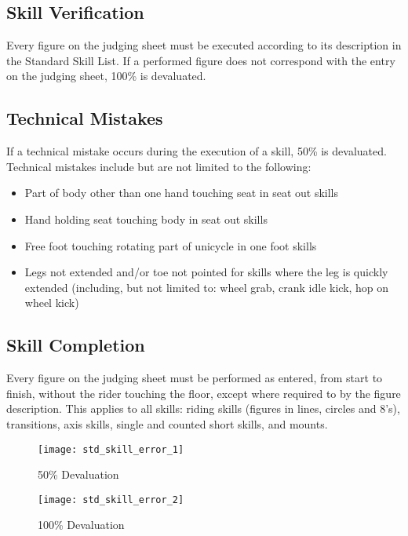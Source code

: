 \subsection{Skill Verification}
Every figure on the judging sheet must be executed according to its description in the Standard Skill List.
If a performed figure does not correspond with the entry on the judging sheet, 100\% is devaluated.

\subsection{Technical Mistakes}
If a technical mistake occurs during the execution of a skill, 50\% is devaluated.
Technical mistakes include but are not limited to the following:
\begin{itemize}
\item Part of body other than one hand touching seat in seat out skills
\item Hand holding seat touching body in seat out skills
\item Free foot touching rotating part of unicycle in one foot skills
\item Legs not extended and/or toe not pointed for skills where the leg is quickly extended (including, but not limited to: wheel grab, crank idle kick, hop on wheel kick)
\end{itemize}

\subsection{Skill Completion \label{subsec:freestyle_difficulty-devaluations_skill-completion}}
Every figure on the judging sheet must be performed as entered, from start to finish, without the rider touching the floor, except where required to by the figure description.
This applies to all skills: riding skills (figures in lines, circles and 8's), transitions, axis skills, single and counted short skills, and mounts.

\begin{wrapfigure}{l}{0.35\textwidth}
\vspace{-25pt}
\begin{center}
\texttt{[image: std\_skill\_error\_1]}
\end{center}
\vspace{-20pt}
\caption{50\% Devaluation \label{fig:std_skill_error_1}}
\vspace{-5pt}
\begin{center}
\texttt{[image: std\_skill\_error\_2]}
\end{center}
\vspace{-20pt}
\caption{100\% Devaluation\label{fig:std_skill_error_2}}
\vspace{-25pt}
\end{wrapfigure}

